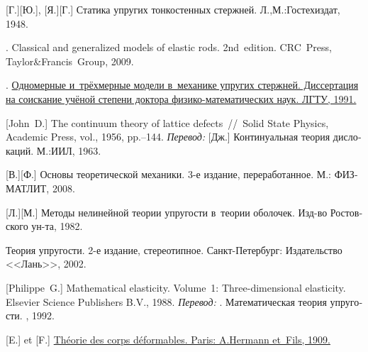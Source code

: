 \begin{thebibliography}{123}
\begin{otherlanguage}{russian}
[Г.][Ю.],
[Я.][Г.]
Статика упругих тонкостенных стержней.
Л.,\:М.:\;Гостехиздат, 1948.

.
Classical and generalized models of elastic rods.
2nd~edition.
CRC~Press, Taylor\:\&\:Francis~Group,
2009.

.
\href{https://www.researchgate.net/publication/320895320_Odnomernye_i_trehmernye_modeli_v_mehanike_uprugih_sterznej}%
{Одномерные и~трёхмерные модели в~механике упругих стержней.
Диссертация
на соискание
учёной степени
доктора
физико-математических наук.
ЛГТУ, 1991.}

[John~D.]
The continuum theory of lattice defects~//~Solid State Physics,
Academic Press,
vol., 1956,
pp.\hbox{--}144.
\emph{Перевод:}
[Дж.]
Континуальная теория дислокаций.
М.:\;ИИЛ,
1963.

[В.][Ф.]
Основы теоретической механики.
3-е издание, переработанное.
М.: ФИЗМАТЛИТ,
2008.

[Л.][М.]
Методы нелинейной теории упругости в~теории оболочек.
Изд\hbox{-}во Ростовского ун\hbox{-}та, 1982.

Теория упругости.
2-е издание, стереотипное.
{Санкт-Петербург}:
Издательство <<Лань>>, 2002.

[Philippe~G.]
Mathematical elasticity.
Volume~1\:: Three-dimensional elasticity.
Elsevier Science Publishers \hbox{B.\hspace{.1ex}V\hspace{-0.2ex}.},
1988.
\emph{Перевод:}
.
Математическая теория упругости.
\mirpublisher,
1992.

[E.] et [F.]
\href{
   https://jscholarship.library.jhu.edu/bitstream/handle/1774.2/34209/31151000327233.pdf
}{
   Théorie des corps déformables.
   Paris:
   A.\:Hermann et~Fils,
   1909.
}


\end{otherlanguage}
\end{thebibliography}

